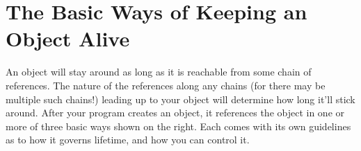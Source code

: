 
\section{The Basic Ways of Keeping an Object Alive}
An object will stay around as long as it is reachable from some chain of
references. The nature of the references along any
chains (for there may be multiple such chains!) leading up to your object will
determine how long it'll stick around.
After your program creates an object, it references the object in one or more of
three basic ways shown on the right.
Each comes with its own guidelines as to how it governs lifetime, and how you
can control it.


\begin{figure}
\centering
{}
\end{figure}

